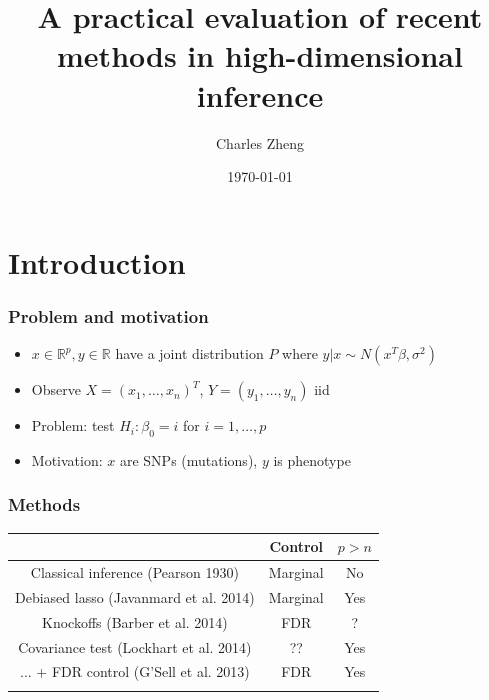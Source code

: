 \documentclass{beamer}
\title{A practical evaluation of recent methods in high-dimensional inference}
\author{Charles Zheng} %
\institute[Stanford] %
{Stanford University}
\date{\today} %
\begin{document}
\begin{frame}
\titlepage %
\end{frame}

\section{Introduction}

\begin{frame}
\frametitle{Problem and motivation}
\begin{itemize}
\item $x \in \mathbb{R}^p, y \in \mathbb{R}$ have a joint distribution $P$ where $y|x \sim N(x^T \beta, \sigma^2)$
\item Observe $X = (x_1, \hdots, x_n)^T$, $Y = (y_1,\hdots, y_n)$ iid
\item Problem: test $H_i: \beta_0 = i$ for $i = 1,\hdots, p$
\item Motivation: $x$ are SNPs (mutations), $y$ is phenotype
\end{itemize}
\end{frame}

\begin{frame}
\frametitle{Methods}
\begin{center}
\begin{tabular}{|c|c|c|} \hline
 & Control & $p > n$\\ \hline
Classical inference (Pearson 1930) & Marginal & No \\ \hline
Debiased lasso (Javanmard et al. 2014) & Marginal & Yes\\ \hline
Knockoffs (Barber et al. 2014) & FDR & ? \\ \hline
Covariance test (Lockhart et al. 2014) &  ?? & Yes \\ 
... + FDR control (G'Sell et al. 2013) &  FDR & Yes \\ \hline
 & &  \\ \hline
\end{tabular}
\end{center}
\end{frame}
\end{document}
